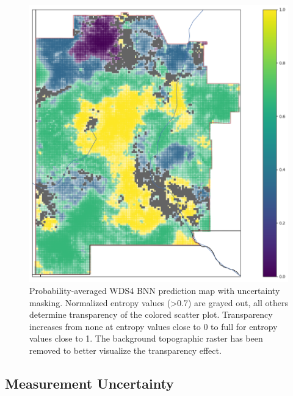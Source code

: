 \begin{figure}[!htp]
\centering
\includegraphics[width=.8\textwidth]{templates/images/Figure-BNN_All_Gradient_Map_Masked_whitebackground.png}
\caption[Parameter uncertainty mask on BNN prediction map]
{Probability-averaged WDS4 BNN prediction map with uncertainty masking. Normalized entropy values (>0.7) are grayed out, all others determine transparency of the colored scatter plot. Transparency increases from none at entropy values close to 0 to full for entropy values close to 1. The background topographic raster has been removed to better visualize the transparency effect.}
\label{fig:bnn_masked_pred_map}
\end{figure}

\subsection{Measurement Uncertainty}\label{ch5:measure_uncertainty}


